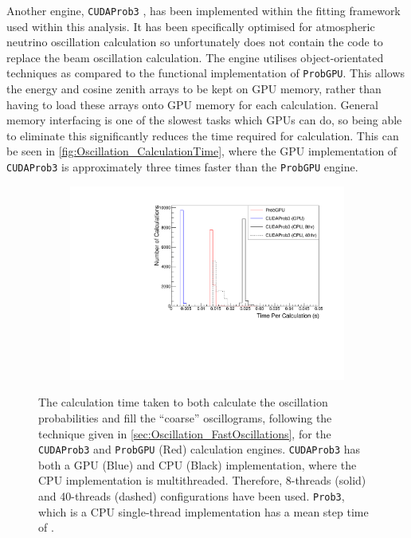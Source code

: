 Another engine, \texttt{CUDAProb3} \cite{cudaprob3}, has been implemented within the fitting framework used within this analysis. It has been specifically optimised for atmospheric neutrino oscillation calculation so unfortunately does not contain the code to replace the beam oscillation calculation. The engine utilises object-orientated techniques as compared to the functional implementation of \texttt{ProbGPU}. This allows the energy and cosine zenith arrays to be kept on GPU memory, rather than having to load these arrays onto GPU memory for each calculation. General memory interfacing is one of the slowest tasks which GPUs can do, so being able to eliminate this significantly reduces the time required for calculation. This can be seen in \autoref{fig:Oscillation_CalculationTime}, where the GPU implementation of \texttt{CUDAProb3} is approximately three times faster than the \texttt{ProbGPU} engine.

\begin{figure}[h]
  \begin{subfigure}[t]{0.8\textwidth}
    \includegraphics[width=\textwidth, trim={0mm 0mm 0mm 0mm}, clip,page=1]{Figures/Oscillation/CalculationTime.pdf}
  \end{subfigure}
  \caption{The calculation time taken to both calculate the oscillation probabilities and fill the ``coarse'' oscillograms, following the technique given in \autoref{sec:Oscillation_FastOscillations},  for the \texttt{CUDAProb3} and \texttt{ProbGPU} (Red) calculation engines. \texttt{CUDAProb3} has both a GPU (Blue) and CPU (Black) implementation, where the CPU implementation is multithreaded. Therefore, 8-threads (solid) and 40-threads (dashed) configurations have been used. \texttt{Prob3}, which is a CPU single-thread implementation has a mean step time of .}
  \label{fig:Oscillation_CalculationTime}
\end{figure}


